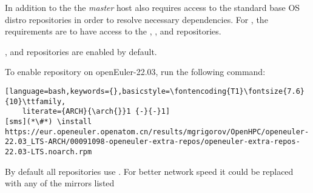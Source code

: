 In addition to the \OHPC{} 
\iftoggle{isxCAT}{and \xCAT{} package repositories,}{package repository,}
the {\em master} host also requires access to the standard base OS distro
repositories in order to resolve necessary dependencies. For \baseOS{}, the
requirements are to have access to the {\color{purple}{OS}}, {\color{purple}{Everything}},
{\color{purple}{EPOL main}} and {\color{purple}{EPOL update}} repositories.

{\color{purple}{OS}}, {\color{purple}{Everything}} and {\color{purple}{EPOL main}} 
repositories are enabled by default.

To enable {\color{purple}{EPOL update}} repository on openEuler-22.03, run the following command:
\begin{lstlisting}[language=bash,keywords={},basicstyle=\fontencoding{T1}\fontsize{7.6}{10}\ttfamily,
	literate={ARCH}{\arch{}}1 {-}{-}1]
[sms](*\#*) \install https://eur.openeuler.openatom.cn/results/mgrigorov/OpenHPC/openeuler-22.03_LTS-ARCH/00091098-openeuler-extra-repos/openeuler-extra-repos-22.03-LTS.noarch.rpm
\end{lstlisting}

By default all repositories use {\color{blue}{http://repo.openeuler.org}}. 
For better network speed it could be replaced with any of the mirrors listed
\href{https://www.openeuler.org/en/mirror/list/}{\color{blue}{here}}

